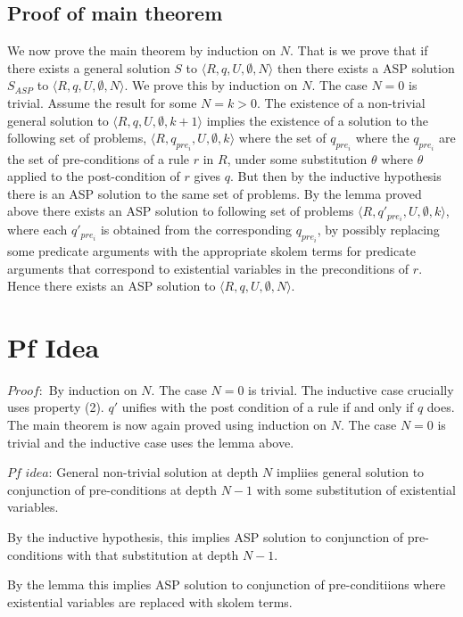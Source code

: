 \documentclass[sigconf]{acmart}
\begin{document}
\subsection{Proof of main theorem}
We now prove the main theorem by induction on $N$. That is we prove that if
there exists a general solution $S$ to $\langle R,q,U,\emptyset,N\rangle$ then there exists
a ASP solution $S_{ASP}$ to $\langle R,q,U,\emptyset,N\rangle$. We prove this by induction
on $N$. The case $N=0$ is trivial. Assume the result for some $N=k>0$. The
existence of a non-trivial general solution to $\langle R,q,U,\emptyset,k+1\rangle$ implies
the existence of a solution to the following set of problems,
$\langle R,q_{pre_{i}},U,\emptyset,k\rangle$ where the set of $q_{pre_{i}}$ where the
$q_{pre_{i}}$ are the set of pre-conditions of a rule $r$ in $R$, under some
substitution $\theta$ where $\theta$ applied to the post-condition of $r$
gives $q$. But then by the inductive hypothesis there is an ASP solution to
the same set of problems. By the lemma proved above there exists an ASP
solution to following set of problems $\langle R,q'_{pre_{i}},U,\emptyset,k\rangle$, where
each $q'_{pre_{i}}$ is obtained from the corresponding $q_{pre_{i}}$, by
possibly replacing some predicate arguments with the appropriate skolem terms
for predicate arguments that correspond to existential variables in the
preconditions of $r$. Hence there exists an ASP solution to
$\langle R,q,U,\emptyset,N\rangle$.

\section{Pf Idea}

$Proof:$ By induction on $N$. The case $N=0$ is trivial. The inductive case crucially uses property (2). $q'$ unifies with the post condition of a rule if and only if $q$ does.
The main theorem is now again proved using induction on $N$. The case $N=0$ is trivial and the inductive case uses the lemma above.

$Pf$ $idea$: General non-trivial solution at depth $N$ impliies general solution to conjunction of pre-conditions at depth $N-1$ with some substitution of existential variables.

By the inductive hypothesis, this implies ASP solution to conjunction of pre-conditions with that substitution at depth $N-1$.

By the lemma this implies ASP solution to conjunction of pre-conditiions where existential variables are replaced with skolem terms. 
\end{document}
